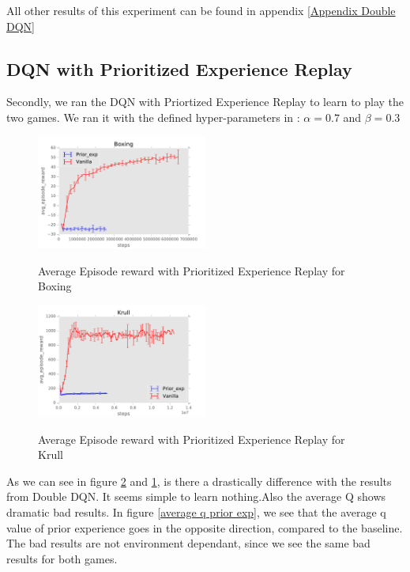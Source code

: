 \documentclass{sig-alternate}
\begin{document}
All other results of this experiment can be found in appendix \ref{Appendix Double DQN}

\subsection{DQN with Prioritized Experience Replay}

Secondly, we ran the DQN with Priortized Experience Replay to learn to play the two games. We ran it with the defined hyper-parameters in \cite{schaul2015prioritized}: $\alpha=0.7$  and $\beta=0.3$

\begin{figure}[h!]
    \centering
    \includegraphics[width=0.5\textwidth]{../results/Boxing/Comparisons/Prior_exp/Prior_exp-baseline-avg_episode_reward.pdf}
    \label{boxing priorexp}
    \caption{Average Episode reward with Prioritized Experience Replay for Boxing}
\end{figure}

\begin{figure}[h!]
    \centering
    \includegraphics[width=0.5\textwidth]{../results/Krull/Comparisons/Prior_exp/Prior_exp-baseline-avg_episode_reward.pdf}
    \label{krull priorexp}
    \caption{Average Episode reward with Prioritized Experience Replay for Krull}
\end{figure}

As we can see in figure \ref{krull priorexp} and \ref{boxing priorexp}, is there a drastically difference with the results from Double DQN. It seems simple to learn nothing.Also the average Q shows dramatic bad results. In figure \ref{average q prior exp}, we see that the average q value of prior experience goes in the opposite direction, compared to the baseline. The bad results are not environment dependant, since we see the same bad results for both games.
\end{document}
